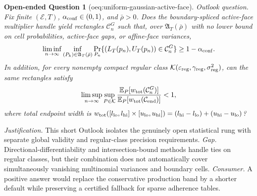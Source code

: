 \documentclass{article}
\newtheorem{openendedquestion}{Open-ended Question}
\begin{document}
\begin{openendedquestion}[oeq:uniform-gaussian-active-face]\label{oeq:uniform-gaussian-active-face}
Outlook question. Fix finite \((\mathcal E,T)\), \(\alpha_{\rm conf}\in(0,1)\), and \(\bar\rho>0\). Does the boundary-spliced active-face multiplier handle yield rectangles \(\mathcal C^G_n\) such that, over \(\mathfrak A_T(\bar\rho)\) with no lower bound on cell probabilities, active-face gaps, or affine-face variances, \[\liminf_{n\to\infty}\inf_{(P_k)\in\mathfrak A_T(\bar\rho)}\Pr_{P_n}\{(L_T(p_n),U_T(p_n))\in\mathcal C^G_n\}\geq1-\alpha_{\rm conf}.\] In addition, for every nonempty compact regular class \(\mathcal K(\varepsilon_{\rm reg},\gamma_{\rm reg},\sigma^2_{\rm reg})\), can the same rectangles satisfy \[\limsup_{n\to\infty}\sup_{P\in\mathcal K}\frac{\mathbb E_P[w_{\rm tot}(\mathcal C^G_n)]}{\mathbb E_P[w_{\rm tot}(\mathcal C_{\rm end})]}<1,\] where total endpoint width is \(w_{\rm tot}([l_{\rm lo},l_{\rm hi}]\times[u_{\rm lo},u_{\rm hi}])=(l_{\rm hi}-l_{\rm lo})+(u_{\rm hi}-u_{\rm lo})\)?
\end{openendedquestion}
\par\smallskip\noindent \textit{Justification.} This short Outlook isolates the genuinely open statistical rung with separate global validity and regular-class precision requirements. \textit{Gap.} Directional-differentiability and intersection-bound methods handle ties on regular classes, but their combination does not automatically cover simultaneously vanishing multinomial variances and boundary cells. \textit{Consumer.} A positive answer would replace the conservative production band by a shorter default while preserving a certified fallback for sparse adherence tables.
\end{document}
